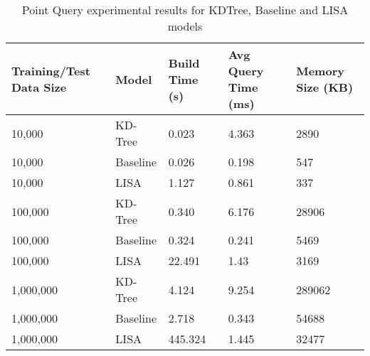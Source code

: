 \begin{table}
	\centering
\centering
	\begin{tabular}{||p{}<{\centering}|p{}<{\centering}|p{}<{\centering}|p{}<{\centering}|p{}<{\centering}||}
		\hline
		Training/Test Data Size& Model & Build Time (s) & Avg Query Time (ms) & Memory Size (KB)\\ [0.5ex] 
		\hline
		\hline
	 	10,000& KD-Tree & 0.023 & 4.363 & 2890 \\
	 	\hline
	 	10,000& Baseline & 0.026 & 0.198 & 547\\
	 	\hline
	 	10,000& LISA & 1.127&0.861 & 337\\
		\hline
	 	100,000& KD-Tree & 0.340 & 6.176 & 28906 \\
	 	\hline
	 	100,000& Baseline & 0.324 & 0.241 & 5469\\
	 	\hline
	 	100,000& LISA& 22.491& 1.43 & 3169\\
		\hline
	 	1,000,000& KD-Tree& 4.124 & 9.254 & 289062 \\
	 	\hline
	 	1,000,000& Baseline& 2.718 & 0.343 & 54688\\
	 	\hline
	 	1,000,000& LISA& 445.324&1.445 & 32477 \\
		\hline
		\hline
	\end{tabular}
	\caption{Point Query experimental results for KDTree, Baseline and LISA models}
	\label{Point_Query_Comparision}
\end{table}


